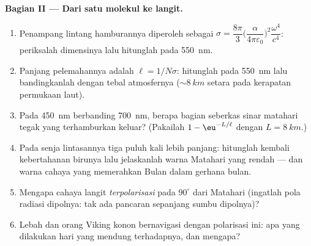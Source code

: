 \begin{problem}
\medskip\noindent\textbf{Bagian II --- Dari satu molekul ke
langit.}
\begin{enumerate}[resume]
  \item Penampang lintang hamburannya diperoleh sebagai $\sigma =
        \dfrac{8\pi}{3}\Big(\dfrac{\alpha}{4\pi\varepsilon_0}
        \Big)^2\dfrac{\omega^4}{c^4}$: periksalah dimensinya lalu
        hitunglah pada \qty{550}{nm}.
  \item Panjang pelemahannya adalah $\ell = 1/N\sigma$: hitunglah
        pada \qty{550}{nm} lalu bandingkanlah dengan tebal
        atmosfernya ($\sim\qty{8}{km}$ setara pada kerapatan
        permukaan laut).
  \item Pada \qty{450}{nm} berbanding \qty{700}{nm}, berapa bagian
        seberkas sinar matahari tegak yang terhamburkan keluar?
        (Pakailah $1 -
        \eu^{-L/\ell}$ dengan $L = \qty{8}{km}$.)
  \item Pada senja lintasannya tiga puluh kali lebih panjang:
        hitunglah kembali kebertahanan birunya lalu jelaskanlah warna
        Matahari yang rendah --- dan warna cahaya yang memerahkan Bulan
        dalam gerhana bulan.
  \item Mengapa cahaya langit \emph{terpolarisasi} pada $90^\circ$
        dari Matahari (ingatlah pola radiasi dipolnya: tak ada
        pancaran sepanjang sumbu dipolnya)?
  \item Lebah dan orang Viking konon bernavigasi dengan polarisasi
        ini: apa yang dilakukan hari yang mendung terhadapnya, dan
        mengapa?
\end{enumerate}


\end{problem}
